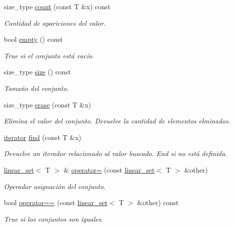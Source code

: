 \begin{DoxyCompactItemize}
size\-\_\-type \hyperlink{classlinear__set_a2199271b0b692ca35bfe4f5ee69b300a}{count} (const T \&x) const 
\begin{DoxyCompactList}\small\item\em Cantidad de apariciones del valor. \end{DoxyCompactList}\item 
bool \hyperlink{classlinear__set_ad1ebf082279d7992e12b434d52cf2338}{empty} () const 
\begin{DoxyCompactList}\small\item\em True si el conjunto está vacío. \end{DoxyCompactList}\item 
size\-\_\-type \hyperlink{classlinear__set_a48c78a9f6814516482724214d685540e}{size} () const 
\begin{DoxyCompactList}\small\item\em Tamaño del conjunto. \end{DoxyCompactList}\item 
size\-\_\-type \hyperlink{classlinear__set_a264d97735943af5490e73e469c3e7303}{erase} (const T \&x)
\begin{DoxyCompactList}\small\item\em Elimina el valor del conjunto. Devuelve la cantidad de elementos elminados. \end{DoxyCompactList}\item 
\hyperlink{classlinear__set_1_1iterator}{iterator} \hyperlink{classlinear__set_a415e0c8461f6a702129b7612a538ffb1}{find} (const T \&x)
\begin{DoxyCompactList}\small\item\em Devuelve un iterador relacionado al valor buscado. End si no está definida. \end{DoxyCompactList}\item 
\hyperlink{classlinear__set}{linear\-\_\-set}$<$ T $>$ \& \hyperlink{classlinear__set_a5bea24f94c4ea45550ec4b066ffb8cf1}{operator=} (const \hyperlink{classlinear__set}{linear\-\_\-set}$<$ T $>$ \&other)
\begin{DoxyCompactList}\small\item\em Operador asignación del conjunto. \end{DoxyCompactList}\item 
bool \hyperlink{classlinear__set_a519aaf53184baa0fb250dc13031c1c52}{operator==} (const \hyperlink{classlinear__set}{linear\-\_\-set}$<$ T $>$ \&other) const 
\begin{DoxyCompactList}\small\item\em True si los conjuntos son iguales. \end{DoxyCompactList}\item 

\end{DoxyCompactItemize}
